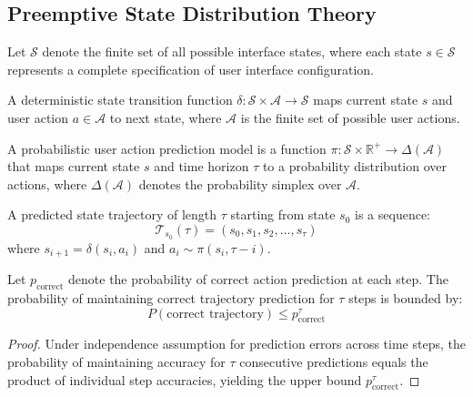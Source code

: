 \subsection{Preemptive State Distribution Theory}

\begin{definition}
Let $\mathcal{S}$ denote the finite set of all possible interface states, where each state $s \in \mathcal{S}$ represents a complete specification of user interface configuration.
\end{definition}

\begin{definition}
A deterministic state transition function $\delta: \mathcal{S} \times \mathcal{A} \to \mathcal{S}$ maps current state $s$ and user action $a \in \mathcal{A}$ to next state, where $\mathcal{A}$ is the finite set of possible user actions.
\end{definition}

\begin{definition}
A probabilistic user action prediction model is a function $\pi: \mathcal{S} \times \mathbb{R}^+ \to \Delta(\mathcal{A})$ that maps current state $s$ and time horizon $\tau$ to a probability distribution over actions, where $\Delta(\mathcal{A})$ denotes the probability simplex over $\mathcal{A}$.
\end{definition}

\begin{definition}
A predicted state trajectory of length $\tau$ starting from state $s_0$ is a sequence:
\begin{equation}
\mathcal{T}_{s_0}(\tau) = (s_0, s_1, s_2, \ldots, s_\tau)
\end{equation}
where $s_{i+1} = \delta(s_i, a_i)$ and $a_i \sim \pi(s_i, \tau - i)$.
\end{definition}

\begin{theorem}
Let $p_{\text{correct}}$ denote the probability of correct action prediction at each step. The probability of maintaining correct trajectory prediction for $\tau$ steps is bounded by:
\begin{equation}
P(\text{correct trajectory}) \leq p_{\text{correct}}^\tau
\end{equation}
\end{theorem}

\begin{proof}
Under independence assumption for prediction errors across time steps, the probability of maintaining accuracy for $\tau$ consecutive predictions equals the product of individual step accuracies, yielding the upper bound $p_{\text{correct}}^\tau$.
\end{proof}

